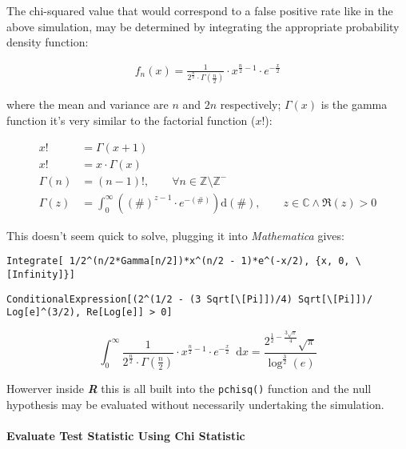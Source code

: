 \documentclass[
]{article}
\begin{document}
The chi-squared value that would correspond to a false positive rate
like in the above simulation, may be determined by integrating the
appropriate probability density function:

\[
\begin{aligned}
f_n\left( x \right)= \frac{1}{2^{\frac{n}{2}} \cdot  \Gamma\left( \frac{n}{2} \right)} \cdot  x^{\frac{n}{2} -  1}\cdot  e^{- \frac{x}{2}}
\end{aligned}
\]

where the mean and variance are \(n\) and \(2n\) respectively;
\(\Gamma\left( x \right)\) is the gamma function it's very similar to
the factorial function (\(x!\)):

\[\begin{aligned}
x! &= \Gamma\left( x+ 1 \right)\\
x! &= x \cdot  \Gamma\left( x \right)\\
\Gamma\left( n \right)&= \left( n- 1 \right)!, \qquad \forall n \in \mathbb{Z} \setminus \mathbb{Z}^- \\
\Gamma\left( z \right) &= \int_{0}^{\infty}\left(  \left( \# \right)^{z- 1}\cdot  e^{-\left( \# \right)} \right) \mathrm{d} \left( \# \right), \qquad z \in \mathbb{C} \wedge \Re\left( z \right)>0
\end{aligned}\]

This doesn't seem quick to solve, plugging it into \emph{Mathematica}
gives:

\begin{verbatim}
Integrate[ 1/2^(n/2*Gamma[n/2])*x^(n/2 - 1)*e^(-x/2), {x, 0, \[Infinity]}]
\end{verbatim}

\begin{verbatim}
ConditionalExpression[(2^(1/2 - (3 Sqrt[\[Pi]])/4) Sqrt[\[Pi]])/ Log[e]^(3/2), Re[Log[e]] > 0]
\end{verbatim}

\[
\int^{\infty}_0\frac{1}{2^{\frac{n}{2}} \cdot  \Gamma\left( \frac{n}{2} \right)} \cdot  x^{\frac{n}{2} -  1}\cdot  e^{- \frac{x}{2}} \enspace \mathrm{d}x =   \frac{2^{\frac{1}{2}-\frac{3 \sqrt{\pi }}{4}} \sqrt{\pi }}{\log ^{\frac{3}{2}}(e)} 
 \]

Howerver inside \textbf{\emph{R}} this is all built into the
\texttt{pchisq()} function and the null hypothesis may be evaluated
without necessarily undertaking the simulation.

\hypertarget{evaluate-test-statistic-using-chi-statistic}{%
\paragraph{Evaluate Test Statistic Using Chi
Statistic}\label{evaluate-test-statistic-using-chi-statistic}}
\end{document}
